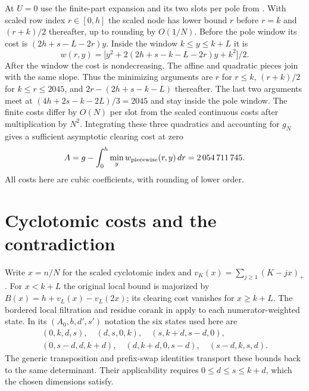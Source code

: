 \documentclass[11pt,a4paper]{article}
\begin{document}
At $U=0$ use the finite-part expansion and its two slots per pole from
\cite{p04-lam}. With scaled row index $r\in[0,h]$ the scaled node has lower
bound $r$ before $r=k$ and $(r+k)/2$ thereafter, up to rounding by
$O(1/N)$. Before the pole window its cost is
$(2h+s-L-2r)y$. Inside the window $k\le y\le k+L$ it is
\[
 w(r,y)=\bigl[y^2+2(2h+s-k-L-2r)y+k^2\bigr]/2 .
\]
After the window the cost is nondecreasing. The affine and quadratic
pieces join with the same slope. Thus the minimizing arguments are
$r$ for $r\le k$, $(r+k)/2$ for $k\le r\le2045$, and
$2r-(2h+s-k-L)$ thereafter. The last two arguments meet at
$(4h+2s-k-2L)/3=2045$ and stay inside the pole window. The
finite costs differ by $O(N)$ per slot from the scaled continuous
costs after multiplication by $N^2$. Integrating these three
quadratics and accounting for $g_N$ gives a sufficient asymptotic
clearing cost at zero
\[
 A=g-\int_0^h\min_y w_{\rm piecewise}(r,y)\,dr
 =2\,054\,711\,745 .
\]
All costs here are cubic coefficients, with rounding of lower order.

\section{Cyclotomic costs and the contradiction}
Write $x=n/N$ for the scaled cyclotomic index and
$v_K(x)=\sum_{j\ge1}(K-jx)_+$. For $x<k+L$ the original local bound is
majorized by $B(x)=h+v_L(x)-v_L(2x)$; its clearing cost vanishes for
$x\ge k+L$. The bordered local filtration and residue corank in \cite{p04-lam}
apply to each numerator-weighted state. In its $(A_0,b,d',s')$ notation
the six states used here are
\[
\begin{gathered}
(0,k,d,s),\quad(d,s,0,k),\quad(s,k+d,s-d,0),\\
(0,s-d,d,k+d),\quad(d,k+d,0,s-d),\quad(s-d,k,s,d).
\end{gathered}
\]
The generic transposition and prefix-swap identities transport these
bounds back to the same determinant. Their applicability requires
$0\le d\le s\le k+d$, which the chosen dimensions satisfy.
\end{document}
